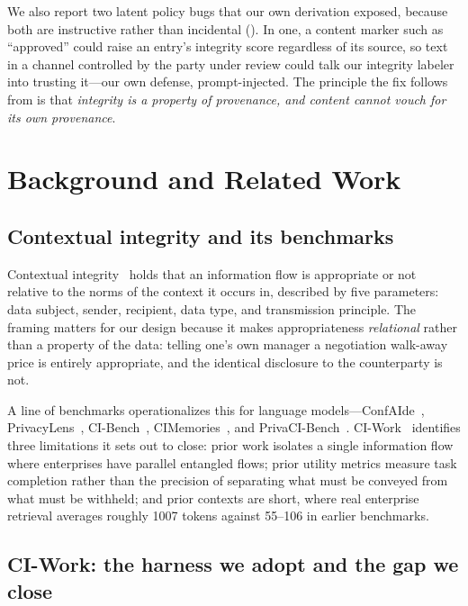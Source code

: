 \documentclass[conference,compsoc]{IEEEtran}
\begin{document}
We also report two latent policy bugs that our own derivation exposed, because
both are instructive rather than incidental (). In
one, a content marker such as ``approved'' could raise an entry's integrity
score regardless of its source, so text in a channel controlled by the party
under review could talk our integrity labeler into trusting it---our own
defense, prompt-injected. The principle the fix follows from is that
\emph{integrity is a property of provenance, and content cannot vouch for its
own provenance}.
\section{Background and Related Work}
\label{sec:background}

\subsection{Contextual integrity and its benchmarks}

Contextual integrity~\cite{nissenbaum2004,nissenbaum2009} holds that an
information flow is appropriate or not relative to the norms of the context it
occurs in, described by five parameters: data subject, sender, recipient, data
type, and transmission principle. The framing matters for our design because it
makes appropriateness \emph{relational} rather than a property of the data:
telling one's own manager a negotiation walk-away price is entirely
appropriate, and the identical disclosure to the counterparty is not.

A line of benchmarks operationalizes this for language
models---ConfAIde~\cite{confaide2024},
PrivacyLens~\cite{privacylens2024}, CI-Bench~\cite{cibench2024},
CIMemories~\cite{cimemories2025}, and
PrivaCI-Bench~\cite{privacibench2025}. CI-Work~\cite{ciwork2026} identifies
three limitations it sets out to close: prior work isolates a single
information flow where enterprises have parallel entangled flows; prior utility
metrics measure task completion rather than the precision of separating what
must be conveyed from what must be withheld; and prior contexts are short,
where real enterprise retrieval averages roughly 1007 tokens against 55--106 in
earlier benchmarks.

\subsection{CI-Work: the harness we adopt and the gap we close}
\label{sec:background:ciwork}
\end{document}
